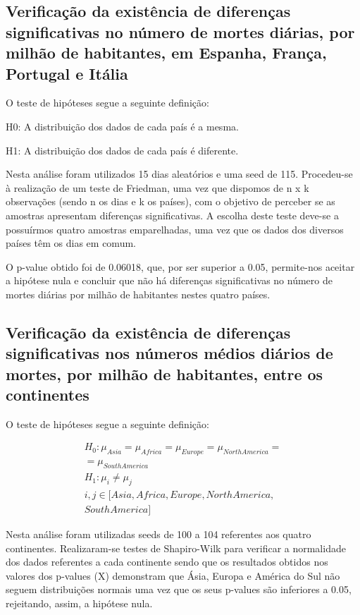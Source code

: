 \documentclass[conference]{IEEEtran}
\begin{document}
\subsection{Verificação da existência de diferenças significativas no número de mortes diárias, por milhão de habitantes, em Espanha, França, Portugal e Itália}
O teste de hipóteses segue a seguinte definição:

H0: A distribuição dos dados de cada país é a mesma.

H1: A distribuição dos dados de cada país é diferente.

Nesta análise foram utilizados 15 dias aleatórios e uma seed de 115. Procedeu-se à realização de um teste de Friedman, uma vez que dispomos de n x k observações (sendo n os dias e k os países), com o objetivo de perceber se as amostras apresentam diferenças significativas. A escolha deste teste deve-se a possuírmos quatro amostras emparelhadas, uma vez que os dados dos diversos países têm os dias em comum.

O p-value obtido foi de 0.06018, que, por ser superior a 0.05, permite-nos aceitar a hipótese nula e concluir que não há diferenças significativas no número de mortes diárias por milhão de habitantes nestes quatro países.


\subsection{Verificação da existência de diferenças significativas nos números médios diários de mortes, por milhão de habitantes, entre os continentes}

O teste de hipóteses segue a seguinte definição:

\begin{equation}
  \begin{array}{l}
    H_{0}:\mu _{Asia}=\mu _{Africa}=\mu _{Europe}=\mu _{North America}= \\
    = \mu _{South America} \\ 
    H_{1}:\mu _{i}\neq \mu _{j} \\
    i,j\in [Asia, Africa, Europe, North America, \\
    South America]
  \end{array}
\end{equation}

Nesta análise foram utilizadas seeds de 100 a 104 referentes aos quatro continentes. Realizaram-se testes de Shapiro-Wilk para verificar a normalidade dos dados referentes a cada continente sendo que os resultados obtidos nos valores dos p-values (X) demonstram que Ásia, Europa e América do Sul não seguem distribuições normais uma vez que os seus p-values são inferiores a 0.05, rejeitando, assim, a hipótese nula.
\end{document}
